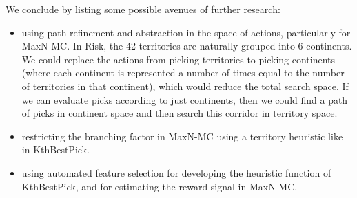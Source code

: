 \documentclass[letterpaper]{article}
\numberwithin{equation}{section}
\numberwithin{theorem}{section}
\numberwithin{lemma}{section}
\numberwithin{df}{section}
\begin{document}
We conclude by listing some possible avenues of further research:
\begin{itemize}
	\item using path refinement and abstraction in the space of actions, particularly for MaxN-MC.  In Risk, the 42 territories are naturally grouped into 6 continents.  We could replace the actions from picking territories to picking continents (where each continent is represented a number of times equal to the number of territories in that continent), which would reduce the total search space.  If we can evaluate picks according to just continents, then we could find a path of picks in continent space and then search this corridor in territory space.
	\item restricting the branching factor in MaxN-MC using a territory heuristic like in KthBestPick.
	\item using automated feature selection for developing the heuristic function of KthBestPick, and for estimating the reward signal in MaxN-MC.
\end{itemize}

%
%

%
%


\end{document}
